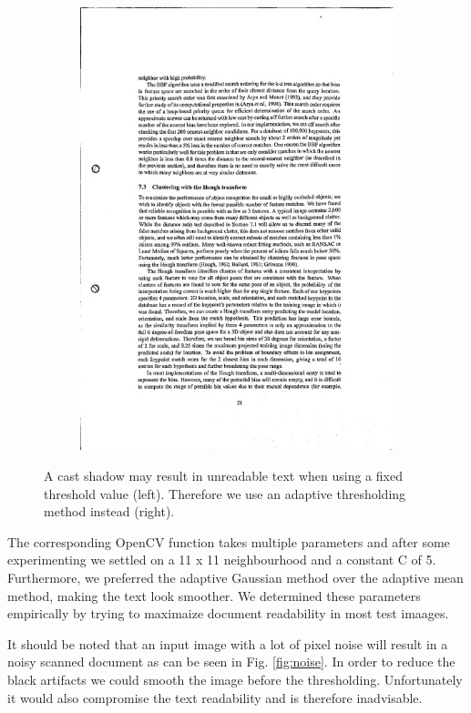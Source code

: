 \documentclass[bibliography=totoc]{scrartcl}
\begin{document}
\begin{figure}[ht!]
\begin{subfigure}[b]{0.3\linewidth}
		\includegraphics[width=\linewidth]{imgs/threshold/bad_lighting_adaptive.jpg}
	\end{subfigure}
	\caption{A cast shadow may result in unreadable text when using a fixed threshold value (left). Therefore we use an adaptive thresholding method instead (right).}
	\label{fig:thresholding}
\end{figure}


The corresponding OpenCV function takes multiple parameters and after some experimenting we settled on a 11 x 11 neighbourhood and a constant C of 5.
Furthermore, we preferred the adaptive Gaussian method over the adaptive mean method, making the text look smoother.
We determined these parameters empirically by trying to maximaize document readability in most test imaages.

It should be noted that an input image with a lot of pixel noise will result in a noisy scanned document as can be seen in Fig. \ref{fig:noise}.
In order to reduce the black artifacts we could smooth the image before the thresholding.
Unfortunately it would also compromise the text readability and is therefore inadvisable. \\
\end{document}
